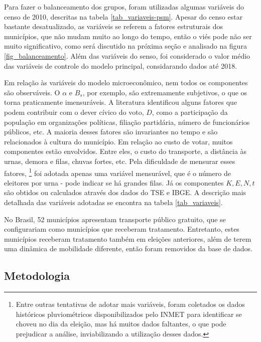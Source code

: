 Para fazer o balanceamento dos grupos, foram utilizadas algumas variáveis do censo de 2010, descritas na tabela \ref{tab_variaveis-psm}. Apesar do censo estar bastante desatualizado, as variáveis se referem a fatores estruturais dos municípios, que não mudam muito ao longo do tempo, então o viés pode não ser muito significativo, como será discutido na próxima seção e analisado na figura \ref{fig_balanceamento}. Além das variáveis do senso, foi considerado o valor médio das variáveis de controle do modelo principal, considarando dados até 2018.



Em relação às variáveis do modelo microeconômico, nem todos os componentes são observáveis. O $\alpha$ e $B_s$, por exemplo, são extremamente subjetivos, o que os torna praticamente imensuráveis. A literatura identificou alguns fatores que podem contribuir com o dever cívico do voto, $D$, como a participação da população em organizações políticas, filiação partidária, número de funcionários públicos, etc. A maioria desses fatores são invariantes no tempo e são relacionados à cultura do município. Em relação ao custo de votar, muitos componentes estão envolvidos. Entre eles, o custo do transporte, a distância às urnas, demora e filas, chuvas fortes, etc. Pela dificuldade de mensurar esses fatores,
\footnote{Entre outras tentativas de adotar mais variáveis, foram coletados os dados históricos pluviométricos disponibilizados pelo INMET para identificar se choveu no dia da eleição, mas há muitos dados faltantes, o que pode prejudicar a análise, inviabilizando a utilização desses dados.}
foi adotada apenas uma variável mensurável, que é o número de eleitores por urna - pode indicar se há grandes filas.  Já os componentes $K, E, N, t$ são obtidos ou calculados através dos dados do TSE e IBGE. A descrição mais detalhada das variáveis adotadas se encontra na tabela \ref{tab_variaveis}.



No Brasil, 52 municípios apresentam transporte público gratuito, que se configurariam como municípios que receberam tratamento. Entretanto, estes municípios receberam tratamento também em eleições anteriores, além de terem uma dinâmica de mobilidade diferente, então foram removidos da base de dados.

\subsection{Metodologia}

